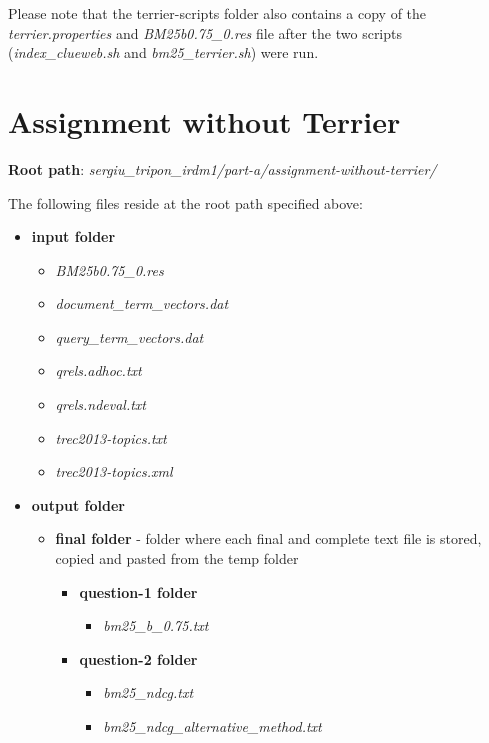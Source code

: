 \documentclass{article} %
\begin{document}
Please note that the terrier-scripts folder also contains a copy of the \textit{terrier.properties} and \textit{BM25b0.75\_0.res} file after the two scripts (\textit{index\_clueweb.sh} and \textit{bm25\_terrier.sh}) were run.

\section*{Assignment without Terrier}

\textbf{Root path}: \textit{sergiu\_tripon\_irdm1/part-a/assignment-without-terrier/}

The following files reside at the root path specified above:

\begin{itemize}
    \item \textbf{input folder}
    \begin{itemize}
        \item \textit{BM25b0.75\_0.res}
        \item \textit{document\_term\_vectors.dat}
        \item \textit{query\_term\_vectors.dat}
        \item \textit{qrels.adhoc.txt}
        \item \textit{qrels.ndeval.txt}
        \item \textit{trec2013-topics.txt}
        \item \textit{trec2013-topics.xml}
    \end{itemize}
    \item \textbf{output folder}
    \begin{itemize}
        \item \textbf{final folder} - folder where each final and complete text file is stored, copied and pasted from the temp folder
        \begin{itemize}
            \item \textbf{question-1 folder}
            \begin{itemize}
                \item \textit{bm25\_b\_0.75.txt}
            \end{itemize}
            \item \textbf{question-2 folder}
            \begin{itemize}
                \item \textit{bm25\_ndcg.txt}
                \item \textit{bm25\_ndcg\_alternative\_method.txt}
            \end{itemize}

\end{itemize}
\end{itemize}
\end{itemize}
\end{document}
